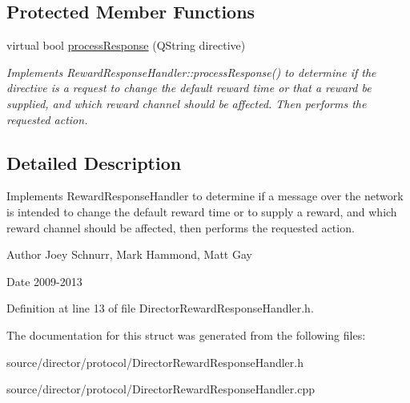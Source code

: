 \subsection*{Protected Member Functions}
\begin{DoxyCompactItemize}
\item 
\hypertarget{struct_director_reward_response_handler_a99465a115664781c139d018269d099ed}{virtual bool \hyperlink{struct_director_reward_response_handler_a99465a115664781c139d018269d099ed}{process\-Response} (Q\-String directive)}\label{struct_director_reward_response_handler_a99465a115664781c139d018269d099ed}

\begin{DoxyCompactList}\small\item\em Implements Reward\-Response\-Handler\-::process\-Response() to determine if the directive is a request to change the default reward time or that a reward be supplied, and which reward channel should be affected. Then performs the requested action. \end{DoxyCompactList}\end{DoxyCompactItemize}


\subsection{Detailed Description}
Implements Reward\-Response\-Handler to determine if a message over the network is intended to change the default reward time or to supply a reward, and which reward channel should be affected, then performs the requested action. 

\begin{DoxyAuthor}{Author}
Joey Schnurr, Mark Hammond, Matt Gay 
\end{DoxyAuthor}
\begin{DoxyDate}{Date}
2009-\/2013 
\end{DoxyDate}


Definition at line 13 of file Director\-Reward\-Response\-Handler.\-h.



The documentation for this struct was generated from the following files\-:\begin{DoxyCompactItemize}
\item 
source/director/protocol/Director\-Reward\-Response\-Handler.\-h\item 
source/director/protocol/Director\-Reward\-Response\-Handler.\-cpp\end{DoxyCompactItemize}
